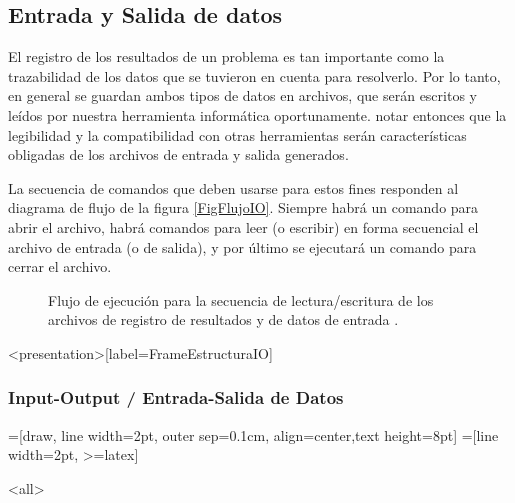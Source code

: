 \subsection{Entrada y Salida de datos}


El registro de los resultados de un problema es tan 
importante como la trazabilidad de los datos 
que se tuvieron en cuenta para resolverlo. Por lo tanto, 
en general se guardan ambos tipos de datos en archivos, 
que serán escritos y leídos por nuestra herramienta 
informática oportunamente. notar entonces que la legibilidad
y la compatibilidad con otras herramientas 
serán características obligadas de los archivos
de entrada y salida generados.

La secuencia de comandos que deben usarse para estos
fines responden al diagrama de flujo de la figura
\autoref{FigFlujoIO}. Siempre habrá un comando para 
abrir el archivo, habrá comandos para leer (o 
escribir) en forma secuencial  el archivo de entrada
(o de salida), y por último se ejecutará un comando 
para cerrar el archivo.

\begin{figure}
\caption{Flujo de ejecución para la secuencia de 
lectura/escritura de los archivos de registro de resultados
y de datos de entrada \label{FigFlujoIO}.}
\end{figure}

\mode*


\begin{frame}<presentation>[label=FrameEstructuraIO]
\frametitle{Input-Output / Entrada-Salida de Datos}
=[draw, line width=2pt,
  outer sep=0.1cm, align=center,text height=8pt]
=[line width=2pt, >=latex]

\end{frame}


\mode<all>
